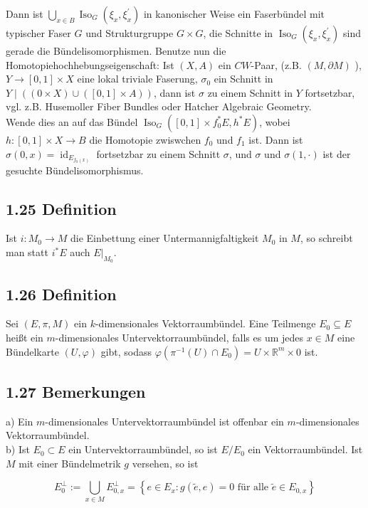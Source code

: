 \documentclass[10pt, letterpaper]{article}
\begin{document}
Dann ist $\bigcup_{x \in B} \operatorname{Iso}_{G}\left(\xi_{x}, \xi_{x}^{\prime}\right)$ in kanonischer Weise ein Faserbündel mit typischer Faser $G$ und Strukturgruppe $G \times G$, die Schnitte in $\operatorname{Iso}_{G}\left(\xi_{x}, \xi_{x}^{\prime}\right)$ sind gerade die Bündelisomorphismen. Benutze nun die Homotopiehochhebungseigenschaft: Ist $(X, A)$ ein $C W$-Paar, (z.B. $(M, \partial M)$ ), $Y \rightarrow[0,1] \times X$ eine lokal triviale Faserung, $\sigma_{0}$ ein Schnitt in $Y \mid((0 \times X) \cup([0,1] \times A))$, dann ist $\sigma$ zu einem Schnitt in $Y$ fortsetzbar, vgl. z.B. Husemoller Fiber Bundles oder Hatcher Algebraic Geometry.\\
Wende dies an auf das Bündel $\operatorname{Iso}_{G}\left([0,1] \times f_{0}^{*} E, h^{*} E\right)$, wobei $h:[0,1] \times X \rightarrow B$ die Homotopie zwiswchen $f_{0}$ und $f_{1}$ ist. Dann ist $\sigma(0, x)=\operatorname{id}_{E_{f_{0}(x)}}$ fortsetzbar zu einem Schnitt $\sigma$, und $\sigma$ und $\sigma(1, \cdot)$ ist der gesuchte Bündelisomorphismus.

\subsection*{1.25 Definition}
Ist $i: M_{0} \rightarrow M$ die Einbettung einer Untermannigfaltigkeit $M_{0}$ in $M$, so schreibt man statt $i^{*} E$ auch $\left.E\right|_{M_{0}}$.

\subsection*{1.26 Definition}
Sei $(E, \pi, M)$ ein $k$-dimensionales Vektorraumbündel. Eine Teilmenge $E_{0} \subseteq E$ heißt ein $m$-dimensionales Untervektorraumbündel, falls es um jedes $x \in M$ eine Bündelkarte $(U, \varphi)$ gibt, sodass $\varphi\left(\pi^{-1}(U) \cap E_{0}\right)=U \times \mathbb{R}^{m} \times 0$ ist.

\subsection*{1.27 Bemerkungen}
a) Ein $m$-dimensionales Untervektorraumbündel ist offenbar ein $m$-dimensionales Vektorraumbündel.\\
b) Ist $E_{0} \subset E$ ein Untervektorraumbündel, so ist $E / E_{0}$ ein Vektorraumbündel. Ist $M$ mit einer Bündelmetrik $g$ versehen, so ist

$$
E_{0}^{\perp}:=\bigcup_{x \in M} E_{0, x}^{\perp}=\left\{e \in E_{x}: g(\tilde{e}, e)=0 \text { für alle } \tilde{e} \in E_{0, x}\right\}
$$
\end{document}
